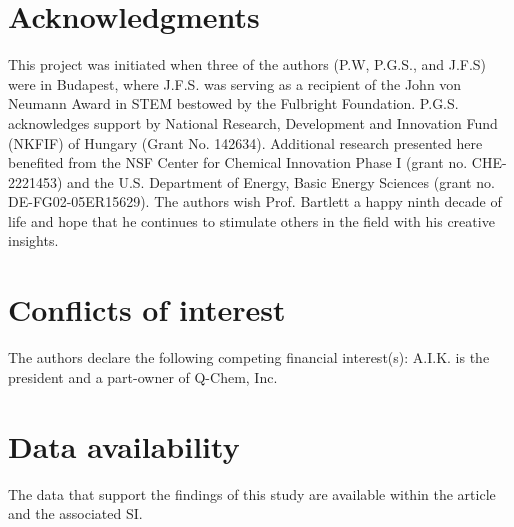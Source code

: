 \documentclass[12pt,prb,aps]{revtex4}
\begin{document}
\section{Acknowledgments} 

This project was initiated when three of the authors (P.W, P.G.S., and J.F.S)
were in Budapest, where J.F.S. was serving as a recipient of the John von
Neumann Award in STEM bestowed by the Fulbright Foundation. 
P.G.S. acknowledges support by National Research, Development and Innovation Fund (NKFIF) of Hungary (Grant No. 142634). Additional
research presented here benefited from the NSF Center for Chemical Innovation
Phase I (grant no. CHE-2221453) and the U.S. Department of Energy, Basic Energy
Sciences (grant no. DE-FG02-05ER15629).  The authors wish
Prof. Bartlett a happy ninth decade of life and hope that he continues to
stimulate others in the field with his creative insights.

\section*{Conflicts of interest}
The authors declare the following competing financial interest(s):
A.I.K. is the president and a part-owner of Q-Chem, Inc.

\section*{Data availability}
The data that support the findings of this study are available within the article and the associated SI.
\clearpage



\end{document}
